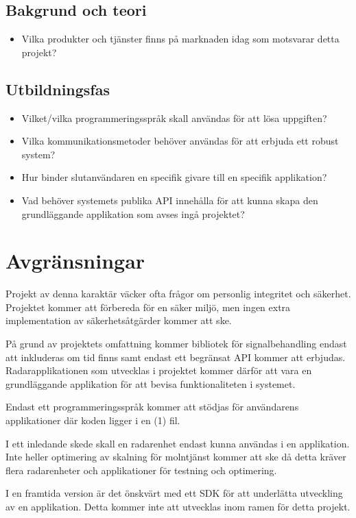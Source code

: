 \subsection*{Bakgrund och teori}
\begin{itemize}
    \item Vilka produkter och tjänster finns på marknaden idag som motsvarar detta projekt?
\end{itemize}

\subsection*{Utbildningsfas}

\begin{itemize}
    \item Vilket/vilka programmeringsspråk skall användas för att lösa uppgiften?
    \item Vilka kommunikationsmetoder behöver användas för att erbjuda ett robust system?
    \item Hur binder slutanvändaren en specifik givare till en specifik applikation?
    \item Vad behöver systemets publika \ac{API} innehålla för att kunna skapa den grundläggande applikation som avses ingå  projektet? 
\end{itemize}

\section{Avgränsningar}
Projekt av denna karaktär väcker ofta frågor om personlig integritet och säkerhet. Projektet kommer att förbereda för en säker miljö, men ingen extra implementation av säkerhetsåtgärder kommer att ske. 

På grund av projektets omfattning  kommer bibliotek för signalbehandling endast att inkluderas om tid finns samt endast ett begränsat \ac{API} kommer att erbjudas. Radarapplikationen som utvecklas i projektet kommer därför att vara en grundläggande applikation för att bevisa funktionaliteten i systemet. 

Endast ett programmeringsspråk kommer att stödjas för användarens applikationer där koden ligger i en (1) fil. 

I ett inledande skede skall en radarenhet endast kunna användas i en applikation. Inte heller optimering av skalning för molntjänst kommer att ske då detta kräver flera radarenheter och applikationer för testning och optimering.

I en framtida version är det önskvärt med ett \ac{SDK} för att underlätta utveckling av en applikation. Detta kommer inte att utvecklas inom ramen för detta projekt.
